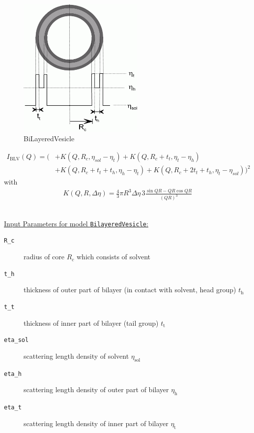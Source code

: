 \begin{figure}[htb]
\begin{center}
\includegraphics[width=0.5441\textwidth,height=0.5858\textwidth]{../images/form_factor/spheres/BiLayeredVesicle.png}
\end{center}
\caption{BiLayeredVesicle} \label{fig:BiLayeredVesicle}
\end{figure}
\begin{align}
I_\text{BLV}(Q) = \bigg( & + K(Q,R_c,\eta_{sol}-\eta_{t})+ K(Q,R_c+t_{t},\eta_{t}-\eta_{h}) \\
&+ K(Q,R_c+t_{t}+t_{h},\eta_{h}-\eta_{t}) +
K(Q,R_c+2t_{t}+t_{h},\eta_{t}-\eta_{sol}) \bigg)^2 \nonumber
\end{align}
with
\begin{align}
 K(Q,R,\Delta\eta) = \frac{4}{3}\pi R^3 \Delta\eta \, 3 \frac{\sin QR - QR \cos QR}{(QR)^3}
\end{align}

\vspace{5mm}
\hspace{1pt}\\
\underline{Input Parameters for model \texttt{BilayeredVesicle}:}\\
\begin{description}
\item[\texttt{R\_c}] radius of core $R_c$ which consists of solvent
\item[\texttt{t\_h}] thickness of outer part of bilayer (in contact with solvent, head group) $t_\text{h}$
\item[\texttt{t\_t}] thickness of inner part of bilayer (tail group) $t_\text{t}$
\item[\texttt{eta\_sol}] scattering length density of solvent $\eta_\text{sol}$
\item[\texttt{eta\_h}] scattering length density of outer part of bilayer $\eta_\text{h}$
\item[\texttt{eta\_t}] scattering length density of inner part of bilayer $\eta_\text{t}$
\end{description}

